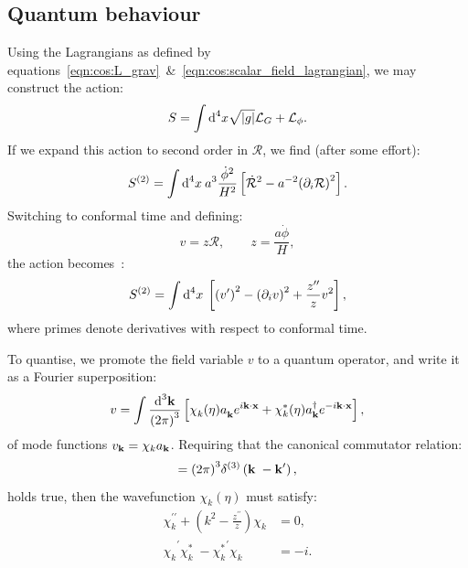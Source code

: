 \subsection{Quantum behaviour}
Using the Lagrangians as defined by equations~\eqref{eqn:cos:L_grav}~\&~\eqref{eqn:cos:scalar_field_lagrangian}, we may construct the action:
\begin{equation}
  S = \int \d[4]{x}\sqrt{|g|}\mathcal{L}_G + \mathcal{L}_\phi.
\end{equation}
If we expand this action to second order in \(\mathcal{R}\), we find (after some effort):
\begin{equation}
  S^{(2)} = \int \d[4]{x}\: a^3 \frac{\dot{\phi}^2}{H^2}\left[ \mathcal{\dot{R}}^2 -a^{-2}{\left( \partial_i\mathcal{R} \right)}^2 \right].
\end{equation}
Switching to conformal time and defining:
\begin{equation}
  v = z \mathcal{R}, \qquad
  z = \frac{a \dot{\phi}}{H},
\end{equation}
the action becomes~\citep[App B]{Baumann+2009}:
\begin{equation}
  S^{(2)} = \int \d[4]{x}\: \left[ {\left( v^{\prime} \right)}^2 - {\left( \partial_i v \right)}^2 + \frac{z^{\prime\prime}}{z}v^2\right],
\end{equation}
where primes denote derivatives with respect to conformal time.

To quantise, we promote the field variable \(v\) to a quantum operator, and write it as a Fourier superposition:
\begin{equation}
  v = \int \frac{\d[3]{\vk}}{{\left( 2\pi \right)}^3}
  \left[ 
    \chi_k^{\phantom\ast}(\eta) a_\vk^{\phantom\dagger}e^{i\vk\cdot\vx} + 
    \chi_k^\ast(\eta) a_\vk^{\dagger}e^{-i\vk\cdot\vx}  
  \right],
  \label{eqn:cos:mode_func_sum}
\end{equation}
of mode functions \(v_\vk = \chi_k a_\vk\).
Requiring that the canonical commutator relation:
\begin{equation}
  [ a_{\vk^{\phantom\prime}}^{\phantom\dagger}, a_{\vk^{\prime}}^{\dagger}] = {\left( 2\pi \right)}^3\delta^{(3)}\left( \vk^{\phantom\prime}-\vk^{\prime} \right),
  \label{eqn:cos:commutator}
\end{equation}
holds true, then the wavefunction \(\chi_k(\eta)\) must satisfy:
\begin{align}
  \chi_k^{\prime\prime} + \left( k^2 - \frac{z^{\prime\prime}}{z} \right) \chi_k &=0,
  \label{eqn:cos:mode_func}
  \\
  {\chi_k^{\phantom\ast}}^{\prime} 
  {\chi_k^{\ast}}^{\phantom\prime} 
  -
  {\chi_k^{\ast}}^{\prime} 
  {\chi_k^{\phantom\ast}}^{\phantom\prime} 
  &= -i.
  \label{eqn:cos:mode_func_normalisation}
\end{align}
